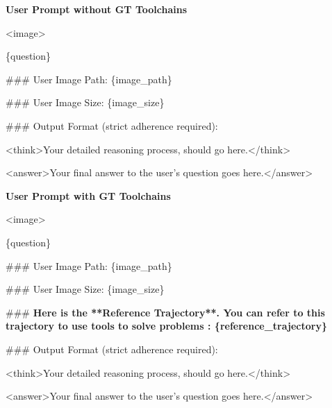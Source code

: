 \documentclass[runningheads]{llncs}
\begin{document}
\begin{tcolorbox}[
    enhanced,               %
    breakable,
    colback=bluebg,         %
    colframe=blueframe,     %
    coltitle=white,         %
    title={User Prompt},  %
    fonttitle=\bfseries\sffamily, %
    fontupper=\footnotesize,
    arc=2.5mm,              %
    boxrule=1.2pt,          %
    drop fuzzy shadow,      %
    left=10pt, right=10pt, top=10pt, bottom=10pt %
]

\noindent\textbf{\textsf{User Prompt without GT Toolchains}}\\
\vspace{1mm}

\noindent   <image>
  
\noindent  \{question\}
  
\noindent  \#\#\# User Image Path: \{image\_path\}
  
\noindent  \#\#\#  User Image Size: \{image\_size\}
  
\noindent  \#\#\#  Output Format (strict adherence required):
  
\noindent  <think>Your detailed reasoning process, should go here.</think>
  
\noindent  <answer>Your final answer to the user's question goes here.</answer>

\vspace{2mm}
\tcbline %
\vspace{2mm}

\noindent\textbf{\textsf{User Prompt with GT Toolchains}}\\
\vspace{1mm}

\noindent   <image>
  
\noindent  \{question\}
  
\noindent  \#\#\# User Image Path: \{image\_path\}
  
\noindent  \#\#\#  User Image Size: \{image\_size\}
  

\noindent \#\#\# \textbf{
 Here is the **Reference Trajectory**. You can refer to this trajectory to use tools to solve problems :  
\{reference\_trajectory\}
}

  
\noindent  \#\#\#  Output Format (strict adherence required):
  
\noindent  <think>Your detailed reasoning process, should go here.</think>
  
\noindent  <answer>Your final answer to the user's question goes here.</answer>

\end{tcolorbox}
\end{document}
